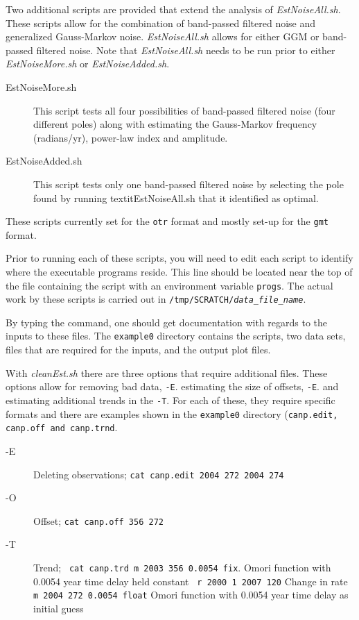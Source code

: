 \documentclass[12pt]{amsart}
\begin{document}
Two additional scripts are provided that extend the analysis of \textit{EstNoiseAll.sh}.  These scripts allow for the combination of band-passed
filtered noise and generalized Gauss-Markov noise. \textit{EstNoiseAll.sh} allows for either GGM or band-passed filtered noise. Note that \textit{EstNoiseAll.sh} 
needs to be run prior to either \textit{EstNoiseMore.sh} or \textit{EstNoiseAdded.sh}.
\begin{description}
\item[EstNoiseMore.sh]  This script tests all four possibilities of band-passed filtered noise (four different poles) along with estimating the Gauss-Markov frequency (radians/yr), power-law index and amplitude.
\item[EstNoiseAdded.sh] This script tests only one band-passed filtered noise by selecting the pole found by running textit{EstNoiseAll.sh} that
it identified as optimal.
\end{description}
These scripts currently set for the \texttt{otr} format and mostly set-up for
the \texttt{gmt} format. 

Prior to running each of these scripts, you will need to edit each script to identify where the executable programs reside.
This line should be located near the top of the file containing the script with an environment variable \texttt{progs}.  The actual
work by these scripts is carried out in \texttt{/tmp/SCRATCH/\textit{data\_file\_name}}.

By typing the command, one should get documentation with regards to the inputs to these files. The \texttt{example0} directory
contains the scripts, two data sets, files that are required for the inputs, and the output plot files.

With \textit{cleanEst.sh} there are three options that require additional files.  These options allow for removing bad data, \texttt{-E}.
estimating the size of offsets, \texttt{-E}. and estimating additional trends in the  \texttt{-T}.  For each of these, they require specific formats
and there are examples shown in the \texttt{example0} directory (\texttt{canp.edit, canp.off and canp.trnd}.

\begin{description}
\item[-E] Deleting observations;
\linebreak \texttt{cat canp.edit
2004 272 2004 274}
\item[-O] Offset;
\linebreak \texttt{cat canp.off
 356
 272}
\item[-T] Trend;
\texttt{
\linebreak
cat canp.trd 
\linebreak 
m 2003 356 0.0054 fix}. \scriptsize{Omori function with 0.0054 year time delay held constant}
\normalsize
\linebreak
\texttt{ r 2000 1 2007 120}  \scriptsize{Change in rate}
\normalsize
\linebreak
\texttt{m 2004 272 0.0054 float} \scriptsize{Omori function with 0.0054 year time delay as initial guess}

\end{description}
\end{document}
